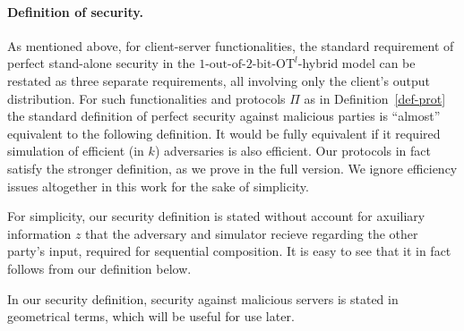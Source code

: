 \documentclass[a4paper]{article}
\newtheorem{definition}{Definition}[section]
\newcommand{\OT}[2]{#1\text{-out-of-}#2\text{-bit-OT}}
\begin{document}
\paragraph{Definition of security.}
As mentioned above, for client-server functionalities, the standard requirement of perfect stand-alone security in the ${\OT{1}{2}}^l$-hybrid model can be restated as three separate requirements, all involving only the client's output distribution.
For such functionalities and protocols $\Pi$ as in Definition~\ref{def-prot} the standard definition of perfect security against malicious parties is ``almost'' equivalent to the following definition.
It would be fully equivalent if it required simulation of efficient (in $k$) adversaries is also efficient. Our protocols in fact satisfy the stronger definition, as we prove in the full version. We ignore efficiency issues altogether in this work for the sake of simplicity. 

For simplicity, our security definition is stated without account for axuiliary information $z$ that the adversary and simulator recieve regarding the other party's input, required for sequential composition. It is easy to see that it in fact follows from our definition below. 

In our security definition, security against malicious servers is stated in geometrical terms, which will be useful for use later.
\end{document}
